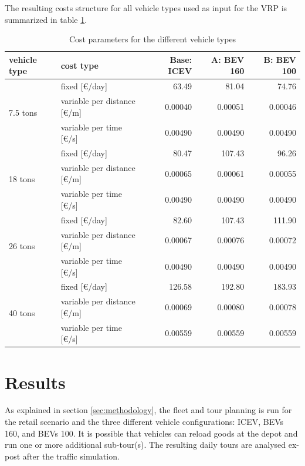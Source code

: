 The resulting costs structure for all vehicle types used as input for the VRP is summarized in table \ref{tab:vehicleTypesCosts}.

\begin{table}[!h!]
	\caption{Cost parameters for the different vehicle types}
	\begin{tabular*}{\hsize}{@{\extracolsep{\fill}}llrrr@{}}
		vehicle type & cost type & Base: ICEV & A: BEV 160 & B: BEV 100 \\
		\midrule
		\multirow{ 3}{50pt}{7.5 tons}  & fixed [\euro/day] & 63.49 & 81.04 & 74.76\\
		& variable per distance [\euro /m] & 0.00040 & 0.00051 & 0.00046\\
		& variable per time [\euro /s] &  0.00490 & 0.00490 & 0.00490\\ \hline
		
		\multirow{ 3}{50pt}{18 tons}  & fixed [\euro/day] & 80.47 & 107.43 & 96.26\\
		& variable per distance [\euro /m] & 0.00065 & 0.00061  & 0.00055\\
		& variable per time [\euro /s] &  0.00490 & 0.00490 & 0.00490\\ \hline
		
		\multirow{ 3}{50pt}{26 tons}  & fixed [\euro/day] & 82.60 & 107.43  & 111.90\\
		& variable per distance [\euro /m] & 0.00067 & 0.00076  & 0.00072\\
		& variable per time [\euro /s] &  0.00490 & 0.00490 & 0.00490\\ \hline
		
		\multirow{ 3}{50pt}{40 tons}  & fixed [\euro/day] & 126.58 & 192.80 & 183.93\\
		& variable per distance [\euro /m] & 0.00069 & 0.00080 & 0.00078\\
		& variable per time [\euro /s] &  0.00559 & 0.00559 & 0.00559\\ \hline
		
	\end{tabular*}
	\label{tab:vehicleTypesCosts}
\end{table}

\section{Results}
\label{sec:results}
As explained in section \ref{sec:methodology}, the fleet and tour planning is run for the retail scenario and the three different vehicle configurations: ICEV, BEVs 160, and BEVs 100. It is possible that vehicles can reload goods at the depot and run one or more additional sub-tour(s). The resulting daily tours are analysed ex-post after the traffic simulation. 


